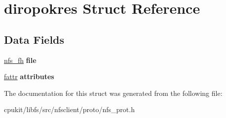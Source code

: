 \hypertarget{structdiropokres}{}\section{diropokres Struct Reference}
\label{structdiropokres}
\subsection*{Data Fields}
\begin{DoxyCompactItemize}
\item 
\mbox{\label{structdiropokres_a69d17a933025df08f6ad82aa6308c831}} 
\mbox{\hyperlink{structnfs__fh}{nfs\+\_\+fh}} {\bfseries file}
\item 
\mbox{\label{structdiropokres_a77e53df04a70a1622063921fe7de8b68}} 
\mbox{\hyperlink{structfattr}{fattr}} {\bfseries attributes}
\end{DoxyCompactItemize}


The documentation for this struct was generated from the following file\+:\begin{DoxyCompactItemize}
\item 
cpukit/libfs/src/nfsclient/proto/nfs\+\_\+prot.\+h\end{DoxyCompactItemize}
